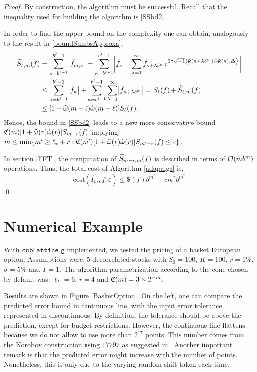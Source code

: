 \documentclass[graybox]{svmult}
\newcommand{\bsDelta}{\boldsymbol{\Delta}}    %
\begin{document}
\begin{proof}
By construction, the algorithm must be successful. Recall that the inequality used for building the algorithm is \eqref{SSbd2}.

In order to find the upper bound on the complexity one can obtain, analogously to the result in \eqref{boundSumbsApproxa},
\begin{align}
\nonumber
\tS_{\ell,m}(f) &= \sum_{\kappa=b^{\ell-1}}^{b^{\ell}-1} \bigabs{ \tf_{m,\kappa}} = \sum_{\kappa=b^{\ell-1}}^{b^{\ell}-1} \biggabs{\hf_{\kappa} + \sum_{\lambda=1}^{\infty} \hf_{\kappa+\lambda b^{m}} \E^{2 \pi \sqrt{-1} \ip{\tvk(\kappa+\lambda b^{m}) \ominus \tvk(\kappa)}{\bsDelta}}}\\
\nonumber
&\le \sum_{\kappa=b^{\ell-1}}^{b^{\ell}-1} \bigabs{\hf_{\kappa}} + \sum_{\kappa=b^{\ell-1}}^{b^{\ell}-1} \sum_{\lambda=1}^{\infty} \bigabs{\hf_{\kappa+\lambda b^{m}}} 
= S_{\ell}(f) + \hS_{\ell,m}(f) \\
\nonumber
&\le [1  + \homega(m-\ell) \wcomega(m-\ell)] S_\ell(f). \label{SSbd3}
\end{align}
Hence, the bound in \eqref{SSbd2} leads to a new more conservative bound $\mathfrak{C}(m) [1  + \widehat{\omega}(r) \mathring{\omega}(r)] S_{m-r}(f)$ implying $
m \le {\min \{m' \ge \ell_*+r : \mathfrak{C}(m') [1+ \widehat{\omega}(r) \mathring{\omega}(r)] S_{m'-r}(f) \le \varepsilon \}}$.

In section \ref{FFT}, the computation of $\widetilde{S}_{m-r,m}(f)$ is described in terms of $\mathcal{O}(mb^m)$ operations. Thus, the total cost of Algorithm \ref{adapalgo} is,
\[
\mathrm{cost}\left(\widehat{I}_m,f,\varepsilon\right)\leq \$(f)b^{m^*}+cm^*b^{m^*}
\]
\hfill \qed
\end{proof}

\section{Numerical Example} \label{secnumexpsec}

With $\texttt{cubLattice\_g}$ implemented, we tested the pricing of a basket European option. Assumptions were: 5 decorrelated stocks with $S_0=100$, $K=100$, $r=1\%$, $\sigma=5\%$ and $T=1$. The algorithm parametrization according to the cone chosen by default was: $\ell_*=6$, $r=4$ and $\mathfrak{C}(m)=3 \times 2^{-m}$.

Results are shown in Figure \ref{BasketOption}. On the left, one can compare the predicted error bound in continuous line, with the input error tolerance represented in discontinuous. By definition, the tolerance should be above the prediction, except for budget restrictions. However, the continuous line flattens because we do not allow to use more than $2^{17}$ points. This number comes from the Korobov construction using $17797$ as suggested in \cite{HicEtal00}. Another important remark is that the predicted error might increase with the number of points. Nonetheless, this is only due to the varying random shift taken each time.
\end{document}
